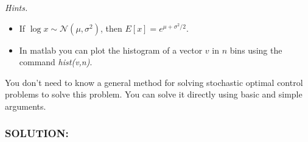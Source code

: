 \documentclass[]{article}
\newcommand{\Solution}{\subsubsection*{\textbf{SOLUTION:}}}
\begin{document}
\emph{Hints.}
\begin{itemize}
    \item If $\log x \sim \mathcal{N}(\mu,\sigma^2)$, then $E[x] = e^{\mu+\sigma^2/2}$.
    \item In matlab you can plot the histogram of a vector $v$ in $n$ bins using the command \emph{hist(v,n)}.
\end{itemize}
You don't need to know a general method for solving stochastic optimal control problems to solve this problem. You can solve it directly using basic and simple arguments.

\Solution






\newpage
\appendix


\end{document}
